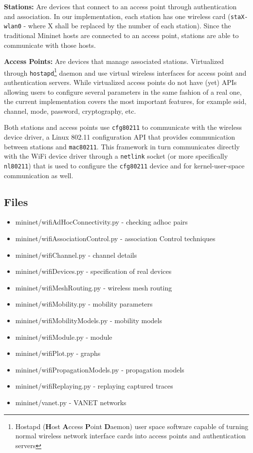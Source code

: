 \noindent \textbf{Stations:} Are devices that connect to an access point through authentication and association. In our implementation, each station has one wireless card (\texttt{staX-wlan0} - where X shall be replaced by the number of each station). Since the traditional Mininet hosts are connected to an access point, stations are able to communicate with those hosts.

\noindent \textbf{Access Points:} Are devices that manage associated stations. Virtualized through \texttt{hostapd}\footnote{Hostapd (\textbf{H}ost \textbf{A}ccess \textbf{P}oint \textbf{D}aemon) user space software capable of turning normal wireless network interface cards into access points and authentication servers} daemon and use virtual wireless interfaces for access point and authentication servers. 
While virtualized access points do not have (yet) APIs allowing users to configure several parameters in the same fashion of a real one, the current implementation covers the most important features, for example ssid, channel, mode, password, cryptography, etc.

Both stations and access points use \texttt{cfg80211} to communicate with the wireless device driver, a Linux 802.11 configuration API that provides communication between stations and \texttt{mac80211}. This framework in turn communicates directly with the WiFi device driver through a \texttt{netlink} socket (or more specifically \texttt{nl80211}) that is used to configure the \texttt{cfg80211} device and for kernel-user-space communication as well.

\subsection{Files}

\begin{itemize}
\item mininet/wifiAdHocConnectivity.py - checking adhoc pairs
\item mininet/wifiAssociationControl.py - association Control techniques
\item mininet/wifiChannel.py - channel details
\item mininet/wifiDevices.py - specification of real devices
\item mininet/wifiMeshRouting.py - wireless mesh routing
\item mininet/wifiMobility.py - mobility parameters
\item mininet/wifiMobilityModels.py - mobility models
\item mininet/wifiModule.py - module 
\item mininet/wifiPlot.py - graphs
\item mininet/wifiPropagationModels.py - propagation models
\item mininet/wifiReplaying.py - replaying captured traces
\item mininet/vanet.py - VANET networks
\end{itemize}

